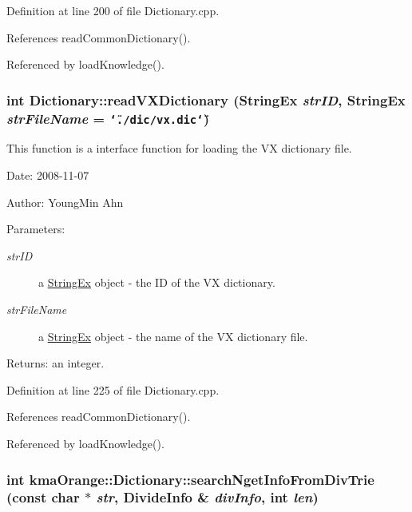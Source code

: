 Definition at line 200 of file Dictionary.cpp.

References readCommonDictionary().

Referenced by loadKnowledge().\hypertarget{classkmaOrange_1_1Dictionary_cae20d922b303760cf7f5328f1a8ac19}{
\subsubsection[{readVXDictionary}]{\setlength{\rightskip}{0pt plus 5cm}int Dictionary::readVXDictionary ({\bf StringEx} {\em strID}, \/  {\bf StringEx} {\em strFileName} = {\tt \char`\"{}./dic/vx.dic\char`\"{}})}}
\label{classkmaOrange_1_1Dictionary_cae20d922b303760cf7f5328f1a8ac19}


This function is a interface function for loading the VX dictionary file. 

\begin{Desc}
\item[Date:]2008-11-07 \end{Desc}
\begin{Desc}
\item[Author:]YoungMin Ahn \end{Desc}
\begin{Desc}
\item[Parameters:]
\begin{description}
\item[{\em strID}]a \hyperlink{classStringEx}{StringEx} object - the ID of the VX dictionary. \item[{\em strFileName}]a \hyperlink{classStringEx}{StringEx} object - the name of the VX dictionary file. \end{description}
\end{Desc}
\begin{Desc}
\item[Returns:]an integer. \end{Desc}


Definition at line 225 of file Dictionary.cpp.

References readCommonDictionary().

Referenced by loadKnowledge().\hypertarget{classkmaOrange_1_1Dictionary_146b66480316ce2cdce51b9a762064be}{
\subsubsection[{searchNgetInfoFromDivTrie}]{\setlength{\rightskip}{0pt plus 5cm}int kmaOrange::Dictionary::searchNgetInfoFromDivTrie (const char $\ast$ {\em str}, \/  {\bf DivideInfo} \& {\em divInfo}, \/  int {\em len})}}
\label{classkmaOrange_1_1Dictionary_146b66480316ce2cdce51b9a762064be}



